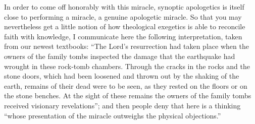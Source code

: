 \documentclass[12pt]{book}
\begin{document}
In order to come off honorably with this miracle, synoptic apologetics is itself close to performing a miracle, a genuine apologetic miracle. So that you may nevertheless get a little notion of how theological exegetics is able to reconcile faith with knowledge, I communicate here the following interpretation, taken from our newest textbooks: ``The Lord's resurrection had taken place when the owners of the family tombs inspected the damage that the earthquake had wrought in these rock-tomb chambers. Through the cracks in the rocks and the stone doors, which had been loosened and thrown out by the shaking of the earth, remains of their dead were to be seen, as they rested on the floors or on the stone benches. At the sight of these remains the owners of the family tombs received visionary revelations''; and then people deny that here is a thinking ``whose presentation of the miracle outweighs the physical objections.''
\end{document}

